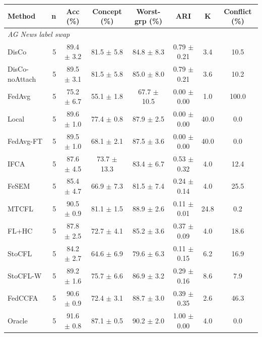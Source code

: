 {\scriptsize
\begin{tabular}{l r c c c c c c}
\toprule
Method & n & Acc (\%) & Concept (\%) & Worst-grp (\%) & ARI & K & Conflict (\%) \\
\midrule
\multicolumn{8}{l}{\textit{AG News label swap}} \\
DisCo & 5 & 89.4 $\pm$ 3.2 & 81.5 $\pm$ 5.8 & 84.8 $\pm$ 8.3 & 0.79 $\pm$ 0.21 & 3.4 & 10.5 \\
DisCo-noAttach & 5 & 89.5 $\pm$ 3.1 & 81.5 $\pm$ 5.8 & 85.0 $\pm$ 8.0 & 0.79 $\pm$ 0.21 & 3.6 & 10.2 \\
FedAvg & 5 & 75.2 $\pm$ 6.7 & 55.1 $\pm$ 1.8 & 67.7 $\pm$ 10.5 & 0.00 $\pm$ 0.00 & 1.0 & 100.0 \\
Local & 5 & 89.6 $\pm$ 1.0 & 77.4 $\pm$ 0.8 & 87.9 $\pm$ 2.5 & 0.00 $\pm$ 0.00 & 40.0 & 0.0 \\
FedAvg-FT & 5 & 89.5 $\pm$ 1.0 & 68.1 $\pm$ 2.1 & 87.5 $\pm$ 3.6 & 0.00 $\pm$ 0.00 & 40.0 & 0.0 \\
IFCA & 5 & 87.6 $\pm$ 4.5 & 73.7 $\pm$ 13.3 & 83.4 $\pm$ 6.7 & 0.53 $\pm$ 0.32 & 4.0 & 12.4 \\
FeSEM & 5 & 85.4 $\pm$ 4.7 & 66.9 $\pm$ 7.3 & 81.5 $\pm$ 7.4 & 0.24 $\pm$ 0.14 & 4.0 & 25.5 \\
MTCFL & 5 & 90.5 $\pm$ 0.9 & 81.1 $\pm$ 1.5 & 88.9 $\pm$ 2.6 & 0.11 $\pm$ 0.01 & 24.8 & 0.2 \\
FL+HC & 5 & 87.8 $\pm$ 2.5 & 72.7 $\pm$ 4.1 & 85.2 $\pm$ 3.6 & 0.37 $\pm$ 0.09 & 4.0 & 18.6 \\
StoCFL & 5 & 84.2 $\pm$ 2.7 & 64.6 $\pm$ 6.9 & 79.6 $\pm$ 6.3 & 0.11 $\pm$ 0.15 & 6.2 & 16.9 \\
StoCFL-W & 5 & 89.2 $\pm$ 1.6 & 75.7 $\pm$ 6.6 & 86.9 $\pm$ 3.2 & 0.29 $\pm$ 0.16 & 8.6 & 7.9 \\
FedCCFA & 5 & 90.6 $\pm$ 0.9 & 72.4 $\pm$ 3.1 & 88.7 $\pm$ 3.0 & 0.39 $\pm$ 0.35 & 2.6 & 46.3 \\
Oracle & 5 & 91.6 $\pm$ 0.8 & 87.1 $\pm$ 0.5 & 90.2 $\pm$ 2.0 & 1.00 $\pm$ 0.00 & 4.0 & 0.0 \\
\bottomrule
\end{tabular}
}

